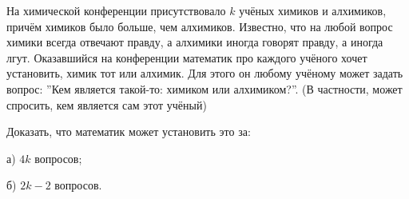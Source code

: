 \begin{thm}
    На химической конференции присутствовало $k$ учёных химиков и алхимиков, причём химиков было больше, чем алхимиков. Известно, что на любой вопрос химики всегда отвечают правду, а алхимики иногда говорят правду, а иногда лгут. Оказавшийся на конференции математик про каждого учёного хочет установить, химик тот или алхимик. Для этого он любому учёному может задать вопрос: ''Кем является такой-то: химиком или алхимиком?''. (В частности, может спросить, кем является сам этот учёный)

\par

Доказать, что математик может установить это за: 
\par
а) $4k$ вопросов;
\par 
б) $2k - 2$ вопросов.
\end{thm}

